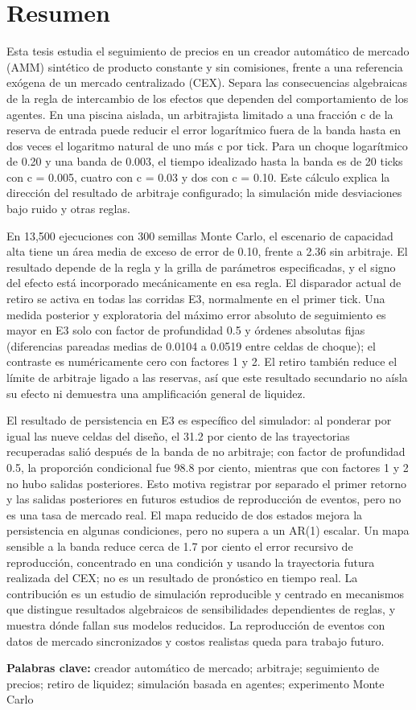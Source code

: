 \section{Resumen}

Esta tesis estudia el seguimiento de precios en un creador automático de mercado (AMM) sintético de producto constante y sin comisiones, frente a una referencia exógena de un mercado centralizado (CEX). Separa las consecuencias algebraicas de la regla de intercambio de los efectos que dependen del comportamiento de los agentes. En una piscina aislada, un arbitrajista limitado a una fracción c de la reserva de entrada puede reducir el error logarítmico fuera de la banda hasta en dos veces el logaritmo natural de uno más c por tick. Para un choque logarítmico de 0.20 y una banda de 0.003, el tiempo idealizado hasta la banda es de 20 ticks con c = 0.005, cuatro con c = 0.03 y dos con c = 0.10. Este cálculo explica la dirección del resultado de arbitraje configurado; la simulación mide desviaciones bajo ruido y otras reglas.

En 13,500 ejecuciones con 300 semillas Monte Carlo, el escenario de capacidad alta tiene un área media de exceso de error de 0.10, frente a 2.36 sin arbitraje. El resultado depende de la regla y la grilla de parámetros especificadas, y el signo del efecto está incorporado mecánicamente en esa regla. El disparador actual de retiro se activa en todas las corridas E3, normalmente en el primer tick. Una medida posterior y exploratoria del máximo error absoluto de seguimiento es mayor en E3 solo con factor de profundidad 0.5 y órdenes absolutas fijas (diferencias pareadas medias de 0.0104 a 0.0519 entre celdas de choque); el contraste es numéricamente cero con factores 1 y 2. El retiro también reduce el límite de arbitraje ligado a las reservas, así que este resultado secundario no aísla su efecto ni demuestra una amplificación general de liquidez.

El resultado de persistencia en E3 es específico del simulador: al ponderar por igual las nueve celdas del diseño, el 31.2 por ciento de las trayectorias recuperadas salió después de la banda de no arbitraje; con factor de profundidad 0.5, la proporción condicional fue 98.8 por ciento, mientras que con factores 1 y 2 no hubo salidas posteriores. Esto motiva registrar por separado el primer retorno y las salidas posteriores en futuros estudios de reproducción de eventos, pero no es una tasa de mercado real. El mapa reducido de dos estados mejora la persistencia en algunas condiciones, pero no supera a un AR(1) escalar. Un mapa sensible a la banda reduce cerca de 1.7 por ciento el error recursivo de reproducción, concentrado en una condición y usando la trayectoria futura realizada del CEX; no es un resultado de pronóstico en tiempo real. La contribución es un estudio de simulación reproducible y centrado en mecanismos que distingue resultados algebraicos de sensibilidades dependientes de reglas, y muestra dónde fallan sus modelos reducidos. La reproducción de eventos con datos de mercado sincronizados y costos realistas queda para trabajo futuro.

\textbf{Palabras clave:} creador automático de mercado; arbitraje; seguimiento de precios; retiro de liquidez; simulación basada en agentes; experimento Monte Carlo

